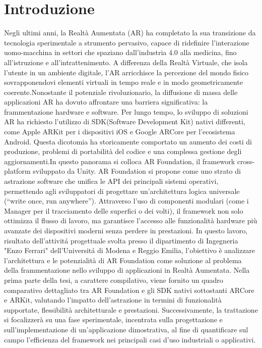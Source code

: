 \chapter{Introduzione}
Negli ultimi anni, la Realtà Aumentata (AR) ha completato la sua transizione da tecnologia sperimentale a strumento pervasivo, capace di ridefinire l'interazione uomo-macchina in settori che spaziano dall'industria 4.0 alla medicina, fino all'istruzione e all'intrattenimento. A differenza della Realtà Virtuale, che isola l'utente in un ambiente digitale, l'AR arricchisce la percezione del mondo fisico sovrapponendovi elementi virtuali in tempo reale e in modo geometricamente coerente.Nonostante il potenziale rivoluzionario, la diffusione di massa delle applicazioni AR ha dovuto affrontare una barriera significativa: la frammentazione hardware e software. Per lungo tempo, lo sviluppo di soluzioni AR ha richiesto l'utilizzo di SDK(Software Development Kit) nativi differenti, come Apple ARKit per i dispositivi iOS e Google ARCore per l'ecosistema Android. Questa dicotomia ha storicamente comportato un aumento dei costi di produzione, problemi di portabilità del codice e una complessa gestione degli aggiornamenti.In questo panorama si colloca AR Foundation, il framework cross-platform sviluppato da Unity. AR Foundation si propone come uno strato di astrazione software che unifica le API dei principali sistemi operativi, permettendo agli sviluppatori di progettare un'architettura logica universale (“write once, run anywhere”). Attraverso l'uso di componenti modulari (come i Manager per il tracciamento delle superfici o dei volti), il framework non solo ottimizza il flusso di lavoro, ma garantisce l'accesso alle funzionalità hardware più avanzate dei dispositivi moderni senza perdere in prestazioni.
In questo lavoro, risultato dell'attivitá progettuale svolta presso il dipartimento di Ingegneria "Enzo Ferrari" dell'Universitá di Modena e Reggio Emilia, l'obiettivo è analizzare l'architettura e le potenzialità di AR Foundation come soluzione al problema della frammentazione nello sviluppo di applicazioni in Realtà Aumentata. Nella prima parte della tesi, a carattere compilativo, viene fornito un quadro comparativo dettagliato tra AR Foundation e gli SDK nativi sottostanti ARCore e ARKit, valutando l'impatto dell'astrazione in termini di funzionalità supportate, flessibilità architetturale e prestazioni. Successivamente, la trattazione si focalizzerà su una fase sperimentale, incentrata sulla progettazione e sull'implementazione di un'applicazione dimostrativa, al fine di quantificare sul campo l'efficienza del framework nei principali casi d'uso industriali o applicativi.